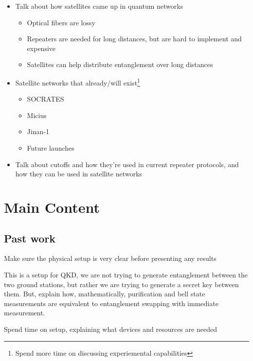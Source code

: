\documentclass[12pt]{article}
\begin{document}
\begin{itemize}
    \item Talk about how satellites came up in quantum networks
    \begin{itemize}
        \item Optical fibers are lossy
        \item Repeaters are needed for long distances, but are hard to implement and expensive
        \item Satellites can help distribute entanglement over long distances
    \end{itemize}
    \item Satellite networks that already/will exist\footnote{Spend more time on discussing experiemental capabilities}
    \begin{itemize}
        \item SOCRATES
        \item Micius
        \item Jinan-1
        \item Future launches
    \end{itemize}
    \item Talk about cutoffs and how they're used in current repeater protocols, and how they can be used in satellite networks
\end{itemize}

\section{Main Content}

\subsection{Past work}

Make sure the physical setup is very clear before presenting any results

This is a setup for QKD, we are not trying to generate entanglement between the two ground stations, but rather we are trying to generate a secret key between them. But, explain how, mathematically, purification and bell state measurements are equivalent to entanglement swapping with immediate measurement.

Spend time on setup, explaining what devices and resources are needed
\end{document}
